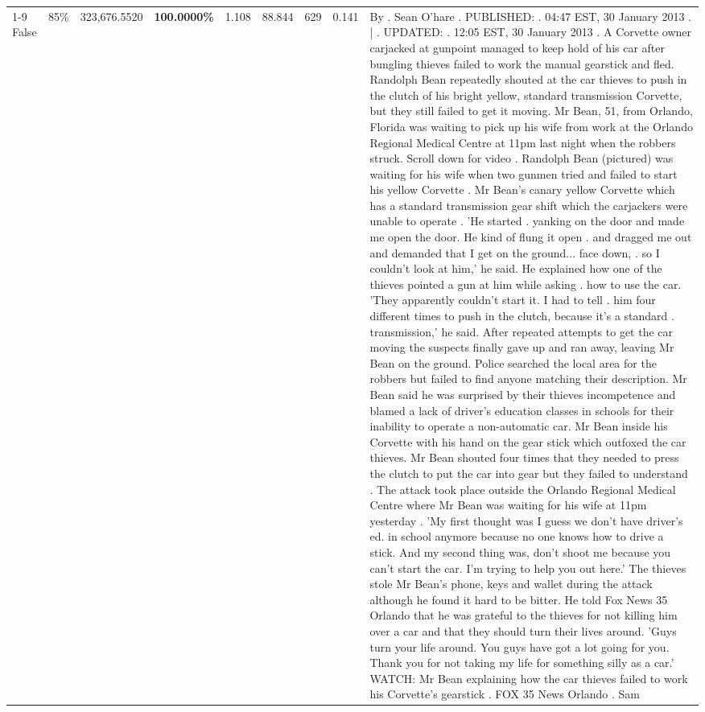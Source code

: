 \begin{table}[H]
\begin{tabular}{lllrlllll}
\cline{1-9} \cline{2-9}
False & 85\% & 323,676.5520 & \bfseries \color{red} 100.0000\% & 1.108 & 88.844 & 629 & 0.141 & By . Sean O'hare . PUBLISHED: . 04:47 EST, 30 January 2013 . | . UPDATED: . 12:05 EST, 30 January 2013 . A Corvette owner carjacked at gunpoint managed to keep hold of his car after bungling thieves failed to work the manual gearstick and fled. Randolph Bean repeatedly shouted at the car thieves to push in the clutch of his bright yellow, standard transmission Corvette, but they still failed to get it moving. Mr Bean, 51, from Orlando, Florida was waiting to pick up his wife from work at the Orlando Regional Medical Centre at 11pm last night when the robbers struck. Scroll down for video . Randolph Bean (pictured) was waiting for his wife when two gunmen tried and failed to start his yellow Corvette . Mr Bean's canary yellow Corvette which has a standard transmission gear shift which the carjackers were unable to operate . 'He started . yanking on the door and made me open the door. He kind of flung it open . and dragged me out and demanded that I get on the ground... face down, . so I couldn't look at him,' he said. He explained how one of the thieves pointed a gun at him while asking . how to use the car. 'They apparently couldn't start it. I had to tell . him four different times to push in the clutch, because it's a standard . transmission,' he said. After repeated attempts to get the car moving the suspects finally gave up and ran away, leaving Mr Bean on the ground. Police searched the local area for the robbers but failed to find anyone matching their description. Mr Bean said he was surprised by their thieves incompetence and blamed a lack of driver's education classes in schools for their inability to operate a non-automatic car. Mr Bean inside his Corvette with his hand on the gear stick which outfoxed the car thieves. Mr Bean shouted four times that they needed to press the clutch to put the car into gear but they failed to understand . The attack took place outside the Orlando Regional Medical Centre where Mr Bean was waiting for his wife at 11pm yesterday . 'My first thought was I guess we don't have driver's ed. in school anymore because no one knows how to drive a stick. And my second thing was, don't shoot me because you can't start the car. I'm trying to help you out here.' The thieves stole Mr Bean's phone, keys and wallet during the attack although he found it hard to be bitter. He told Fox News 35 Orlando that he was grateful to the thieves for not killing him over a car and that they should turn their lives around. 'Guys turn your life around. You guys have got a lot going for you. Thank you for not taking my life for something silly as a car.' WATCH: Mr Bean explaining how the car thieves failed to work his Corvette's gearstick . FOX 35 News Orlando . Sam \\

\end{tabular}
\end{table}
